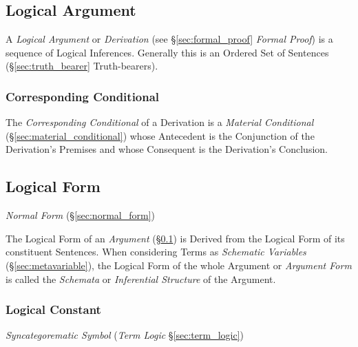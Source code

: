 \subsection{Logical Argument}\label{sec:logical_argument}

A \emph{Logical Argument} or \emph{Derivation} (see
\S\ref{sec:formal_proof} \emph{Formal Proof}) is a sequence of Logical
Inferences. Generally this is an Ordered Set of Sentences
(\S\ref{sec:truth_bearer} Truth-bearers).



\subsubsection{Corresponding Conditional}\label{sec:corresponding_conditional}

The \emph{Corresponding Conditional} of a Derivation is a
\emph{Material Conditional} (\S\ref{sec:material_conditional}) whose
Antecedent is the Conjunction of the Derivation's Premises and whose
Consequent is the Derivation's Conclusion.



\subsection{Logical Form}\label{sec:logical_form}

\emph{Normal Form} (\S\ref{sec:normal_form})

The Logical Form of an \emph{Argument} (\S\ref{sec:logical_argument})
is Derived from the Logical Form of its constituent Sentences. When
considering Terms as \emph{Schematic Variables}
(\S\ref{sec:metavariable}), the Logical Form of the whole Argument or
\emph{Argument Form} is called the \emph{Schemata} or
\emph{Inferential Structure} of the Argument.



\subsubsection{Logical Constant}\label{sec:logical_constant}

\emph{Syncategorematic Symbol} (\emph{Term Logic}
\S\ref{sec:term_logic})



